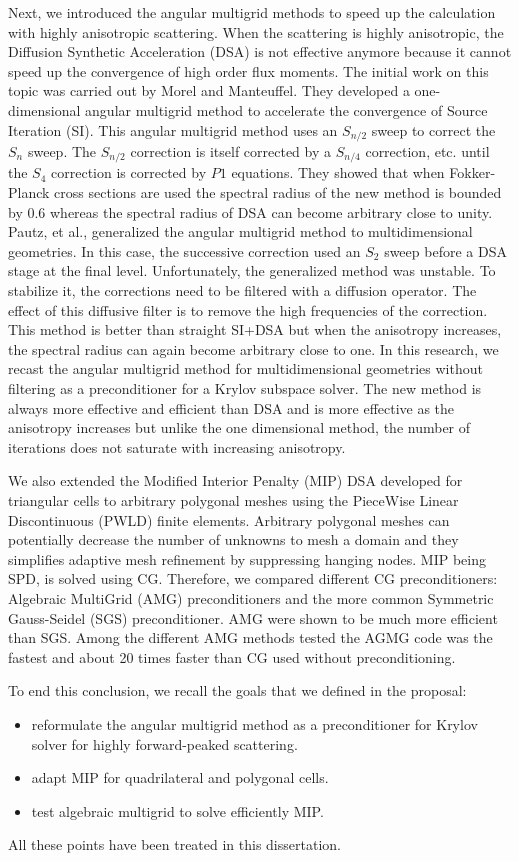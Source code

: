 Next, we introduced the angular multigrid methods to speed up the calculation 
with highly anisotropic scattering. When the scattering is highly anisotropic, 
the Diffusion Synthetic Acceleration (DSA) is not effective anymore because it 
cannot speed up the convergence of high order flux moments. The initial work on 
this topic was carried out by Morel and Manteuffel. 
They developed a one-dimensional angular multigrid method  to
accelerate the convergence of Source Iteration (SI). This angular multigrid 
method uses an $S_{n/2}$ sweep to correct the $S_n$ sweep. The $S_{n/2}$ 
correction is itself corrected by a $S_{n/4}$ correction, etc. until the 
$S_4$ correction is corrected by $P1$ equations. They showed that when 
Fokker-Planck cross sections are used the spectral radius of the new 
method is bounded by 0.6 whereas the spectral radius of DSA can become 
arbitrary close to unity. Pautz, et al., generalized the angular multigrid 
method to multidimensional geometries. In this case, the successive correction
used an $S_2$ sweep before a DSA stage at the final level. Unfortunately, 
the generalized method was unstable. To stabilize it, the corrections need to 
be filtered with a diffusion operator. The effect of this diffusive filter 
is to remove the high frequencies of the correction. This method is better 
than straight SI+DSA but when the
anisotropy increases, the spectral radius can again become arbitrary close to one.
In this research, we recast the angular multigrid method for
multidimensional geometries without filtering as a preconditioner for a Krylov
subspace solver. The new method is always more effective and efficient than 
DSA and is more effective as the anisotropy increases but unlike the one 
dimensional method, the number of iterations does not saturate with 
increasing anisotropy.

We also extended the Modified Interior Penalty (MIP) DSA
developed for triangular cells to arbitrary polygonal meshes using the
PieceWise Linear Discontinuous (PWLD) finite elements. Arbitrary polygonal
meshes can potentially decrease the number of unknowns to mesh a domain and
they simplifies adaptive mesh refinement by suppressing hanging nodes. MIP
being SPD, is solved using CG. Therefore, we compared different
CG preconditioners: Algebraic MultiGrid (AMG) preconditioners and the more 
common Symmetric Gauss-Seidel (SGS) preconditioner. AMG were shown to be much 
more efficient than SGS. Among the different AMG methods tested the AGMG code 
was the fastest and about 20 times faster than CG used without preconditioning.

To end this conclusion, we recall the goals that we defined in the proposal:
\begin{itemize}
  \item reformulate the angular multigrid method as a preconditioner for
    Krylov solver for highly forward-peaked scattering.
  \item adapt MIP for quadrilateral and polygonal cells.
  \item test algebraic multigrid to solve efficiently MIP.
\end{itemize}
All these points have been treated in this dissertation.
